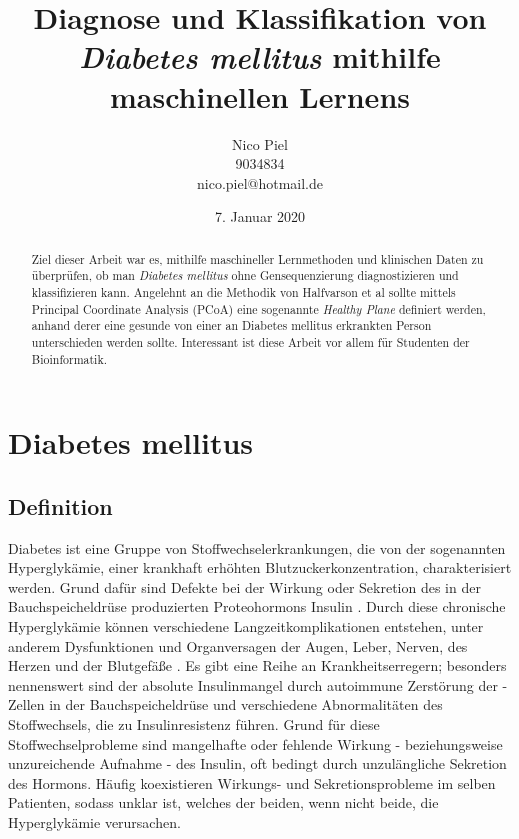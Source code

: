 \documentclass[11.5pt]{article}
\title{Diagnose und Klassifikation von \textit{Diabetes mellitus} mithilfe maschinellen Lernens}
\author{Nico Piel \\ 9034834 \\ nico.piel@hotmail.de}
\date{7. Januar 2020}
\begin{document}
\maketitle

\newpage

\tableofcontents

\newpage

\begin{abstract}

Ziel dieser Arbeit war es, mithilfe maschineller Lernmethoden und klinischen Daten zu überprüfen, ob man \textit{Diabetes mellitus} ohne Gensequenzierung diagnostizieren und klassifizieren kann. 
Angelehnt an die Methodik von Halfvarson et al \cite{dyn} sollte mittels Principal Coordinate Analysis (PCoA) eine sogenannte \textit{Healthy Plane} definiert werden, anhand derer eine gesunde von einer an Diabetes mellitus erkrankten Person unterschieden werden sollte.
Interessant ist diese Arbeit vor allem für Studenten der Bioinformatik.

\end{abstract}

\newpage

\section{Diabetes mellitus}


\subsection{Definition}


Diabetes ist eine Gruppe von Stoffwechselerkrankungen, die von der sogenannten Hyperglykämie, einer krankhaft erhöhten Blutzuckerkonzentration, charakterisiert werden. Grund dafür sind Defekte bei der Wirkung oder Sekretion des in der Bauchspeicheldrüse produzierten Proteohormons Insulin \cite[p.~62]{ada}. Durch diese chronische Hyperglykämie können verschiedene Langzeitkomplikationen entstehen, unter anderem Dysfunktionen und Organversagen der Augen, Leber, Nerven, des Herzen und der Blutgefäße \cite[p.~540]{who}.
Es gibt eine Reihe an Krankheitserregern; besonders nennenswert sind der absolute Insulinmangel durch autoimmune Zerstörung der \textbeta-Zellen in der Bauchspeicheldrüse und verschiedene Abnormalitäten des Stoffwechsels, die zu Insulinresistenz führen. Grund für diese Stoffwechselprobleme sind mangelhafte oder fehlende Wirkung - beziehungsweise unzureichende Aufnahme - des Insulin, oft bedingt durch unzulängliche Sekretion des Hormons. Häufig koexistieren Wirkungs- und Sekretionsprobleme im selben Patienten, sodass unklar ist, welches der beiden, wenn nicht beide, die Hyperglykämie verursachen.
\end{document}
